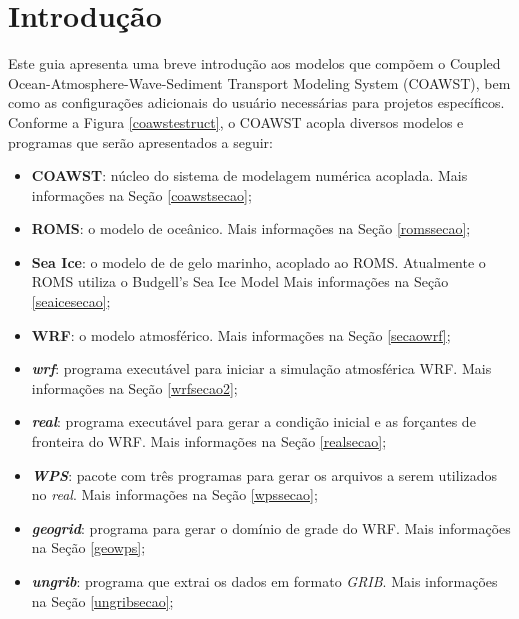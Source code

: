 \chapter{Introdução}
\bigskip

\noindent Este guia apresenta uma breve introdução aos modelos que compõem o Coupled Ocean-Atmosphere-Wave-Sediment Transport Modeling System 
          (COAWST), bem como as configurações adicionais do usuário necessárias para projetos específicos. Conforme a Figura \textcolor{bleu_cite}{\ref{coawstestruct}},
          o COAWST acopla diversos modelos e programas que serão apresentados a seguir:
\bigskip

\begin{itemize}
    \item \textbf{COAWST}: núcleo do sistema de modelagem numérica acoplada. Mais informações na Seção \textcolor{bleu_cite}{\ref{coawstsecao}};
    \item \textbf{ROMS}: o modelo de oceânico. Mais informações na Seção \textcolor{bleu_cite}{\ref{romssecao}};
    \item \textbf{Sea Ice}: o modelo de de gelo marinho, acoplado ao ROMS. Atualmente o ROMS utiliza o Budgell's Sea Ice Model
                            Mais informações na Seção \textcolor{bleu_cite}{\ref{seaicesecao}};
    \item \textbf{WRF}: o modelo atmosférico. Mais informações na Seção \textcolor{bleu_cite}{\ref{secaowrf}};
    \item \textit{\textbf{wrf}}:  programa executável para iniciar a simulação atmosférica WRF. Mais informações na Seção \textcolor{bleu_cite}{\ref{wrfsecao2}};
    \item \textit{\textbf{real}}:  programa executável para gerar a condição inicial e as forçantes de fronteira do WRF. Mais informações na Seção \textcolor{bleu_cite}{\ref{realsecao}};
    \item \textit{\textbf{WPS}}: pacote com três programas para gerar os arquivos a serem utilizados no \textit{real}. Mais informações na Seção \textcolor{bleu_cite}{\ref{wpssecao}};
    \item \textit{\textbf{geogrid}}: programa para gerar o domínio de grade do WRF. Mais informações na Seção \textcolor{bleu_cite}{\ref{geowps}};
    \item \textit{\textbf{ungrib}}: programa que extrai os dados em formato \textit{GRIB}. Mais informações na Seção \textcolor{bleu_cite}{\ref{ungribsecao}};

\end{itemize}
